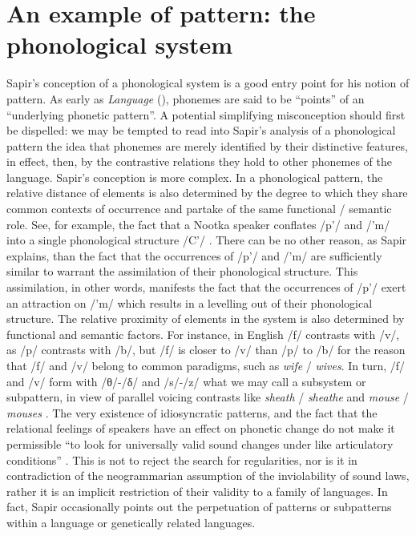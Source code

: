\documentclass[output=paper]{langscibook}
\begin{document}
\section{An example of pattern: the phonological system}
\label{sec:fortis:egpattern}

Sapir's conception of a phonological system is a good entry point for his notion of pattern. As early as \emph{Language} (\citeyear{Sapir1921}), phonemes are said to be ``points'' of an ``underlying phonetic pattern''. A potential simplifying misconception should first be dispelled: we may be tempted to read into Sapir's analysis of a phonological pattern the idea that phonemes are merely identified by their distinctive features, in effect, then, by the contrastive relations they hold to other phonemes of the language. Sapir's conception is more complex. In a phonological pattern, the relative distance of elements is also determined by the degree to which they share common contexts of occurrence and partake of the same functional / semantic role. See, for example, the fact that a Nootka speaker conflates /p'/ and /'m/ into a single phonological structure /C'/ \citep[55--57]{Sapir1933}. There can be no other reason, as Sapir explains, than the fact that the occurrences of /p'/ and /'m/ are sufficiently similar to warrant the assimilation of their phonological structure. This assimilation, in other words, manifests the fact that the occurrences of /p'/ exert an attraction on /'m/ which results in a levelling out of their phonological structure. The relative proximity of elements in the system is also determined by functional and semantic factors. For instance, in English /f/ contrasts with /v/, as /p/ contrasts with /b/, but /f/ is closer to /v/ than /p/ to /b/ for the reason that /f/ and /v/ belong to common paradigms, such as \emph{wife} / \emph{wives}. In turn, /f/ and /v/ form with /θ/-/δ/ and /s/-/z/ what we may call a subsystem or subpattern, in view of parallel voicing contrasts like \emph{sheath} / \emph{sheathe} and \emph{mouse} / \emph{mouses} \citep[48]{Sapir1933}. The very existence of idiosyncratic patterns, and the fact that the relational feelings of speakers have an effect on phonetic change do not make it permissible ``to look for universally valid sound changes under like articulatory conditions'' \citep[48]{Sapir1933}. This is not to reject the search for regularities, nor is it in contradiction of the neogrammarian assumption of the inviolability of sound laws, rather it is an implicit restriction of their validity to a family of languages. In fact, Sapir occasionally points out the perpetuation of patterns or subpatterns within a language or genetically related languages.
\end{document}
